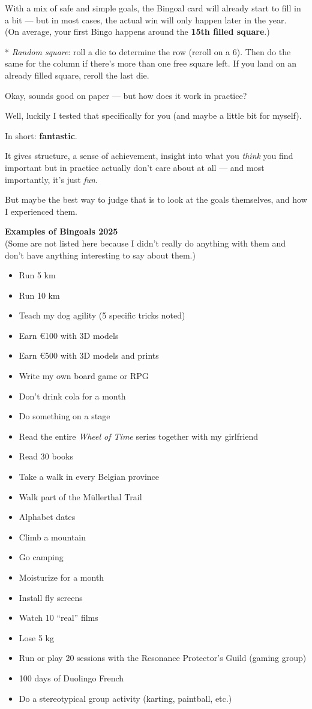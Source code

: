 \documentclass[12pt]{article}
\begin{document}
With a mix of safe and simple goals, the Bingoal card will already start
to fill in a bit --- but in most cases, the actual win will only happen
later in the year.\\
(On average, your first Bingo happens around the \textbf{15th filled
square}.)

* \emph{Random square}: roll a die to determine the row (reroll on a 6).
Then do the same for the column if there's more than one free square
left. If you land on an already filled square, reroll the last die.

Okay, sounds good on paper --- but how does it work in practice?

Well, luckily I tested that specifically for you (and maybe a little bit
for myself).

In short: \textbf{fantastic}.

It gives structure, a sense of achievement, insight into what you
\emph{think} you find important but in practice actually don't care
about at all --- and most importantly, it's just \emph{fun}.

But maybe the best way to judge that is to look at the goals themselves,
and how I experienced them.

\textbf{Examples of Bingoals 2025}\\
(Some are not listed here because I didn't really do anything with them
and don't have anything interesting to say about them.)

\begin{itemize}
\item
  Run 5 km
\item
  Run 10 km
\item
  Teach my dog agility (5 specific tricks noted)
\item
  Earn €100 with 3D models
\item
  Earn €500 with 3D models and prints
\item
  Write my own board game or RPG
\item
  Don't drink cola for a month
\item
  Do something on a stage
\item
  Read the entire \emph{Wheel of Time} series together with my
  girlfriend
\item
  Read 30 books
\item
  Take a walk in every Belgian province
\item
  Walk part of the Müllerthal Trail
\item
  Alphabet dates
\item
  Climb a mountain
\item
  Go camping
\item
  Moisturize for a month
\item
  Install fly screens
\item
  Watch 10 ``real'' films
\item
  Lose 5 kg
\item
  Run or play 20 sessions with the Resonance Protector's Guild (gaming
  group)
\item
  100 days of Duolingo French
\item
  Do a stereotypical group activity (karting, paintball, etc.)
\end{itemize}
\end{document}
